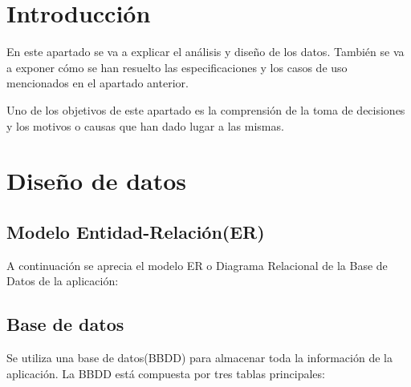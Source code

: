 
\section{Introducción}
En este apartado se va a explicar el análisis y diseño de los datos. También se va a exponer cómo se han resuelto las especificaciones y los casos de uso mencionados en el apartado anterior.  

Uno de los objetivos de este apartado es la comprensión  de la toma de decisiones y los motivos o causas que han dado lugar a las mismas.

\section{Diseño de datos}


\subsection{Modelo Entidad-Relación(ER)}
A continuación se aprecia el modelo ER o Diagrama Relacional de la Base de Datos de la aplicación:


\newpage


\subsection{Base de datos}
Se utiliza una base de datos(BBDD) para almacenar toda la información de la aplicación. La BBDD está compuesta por tres tablas principales:

